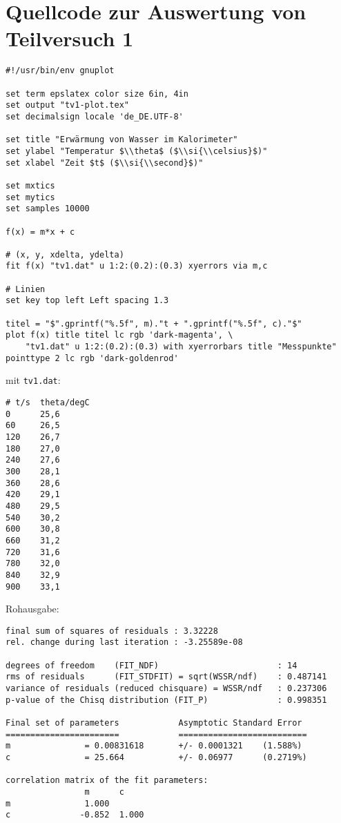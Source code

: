 \section{\gnuplot{} Quellcode zur Auswertung von Teilversuch 1}
	{  
        \renewcommand{\fcolorbox}[4][]{#4}
        \begin{verbatim}
#!/usr/bin/env gnuplot

set term epslatex color size 6in, 4in
set output "tv1-plot.tex"
set decimalsign locale 'de_DE.UTF-8'

set title "Erwärmung von Wasser im Kalorimeter"
set ylabel "Temperatur $\\theta$ ($\\si{\\celsius}$)"
set xlabel "Zeit $t$ ($\\si{\\second}$)"

set mxtics
set mytics
set samples 10000

f(x) = m*x + c

# (x, y, xdelta, ydelta)
fit f(x) "tv1.dat" u 1:2:(0.2):(0.3) xyerrors via m,c

# Linien
set key top left Left spacing 1.3

titel = "$".gprintf("%.5f", m)."t + ".gprintf("%.5f", c)."$"
plot f(x) title titel lc rgb 'dark-magenta', \
	"tv1.dat" u 1:2:(0.2):(0.3) with xyerrorbars title "Messpunkte" pointtype 2 lc rgb 'dark-goldenrod'
        \end{verbatim}
    }
	mit \texttt{tv1.dat}:
    \begin{multicols}{2}
        \begin{verbatim}
# t/s  theta/degC
0      25,6
60     26,5
120    26,7
180    27,0
240    27,6
300    28,1
360    28,6
420    29,1
480    29,5
540    30,2
600    30,8
660    31,2
720    31,6
780    32,0
840    32,9
900    33,1
        \end{verbatim}
    \end{multicols}
    \vspace{-\baselineskip}
	Rohausgabe:
	\begin{verbatim}
final sum of squares of residuals : 3.32228
rel. change during last iteration : -3.25589e-08

degrees of freedom    (FIT_NDF)                        : 14
rms of residuals      (FIT_STDFIT) = sqrt(WSSR/ndf)    : 0.487141
variance of residuals (reduced chisquare) = WSSR/ndf   : 0.237306
p-value of the Chisq distribution (FIT_P)              : 0.998351

Final set of parameters            Asymptotic Standard Error
=======================            ==========================
m               = 0.00831618       +/- 0.0001321    (1.588%)
c               = 25.664           +/- 0.06977      (0.2719%)

correlation matrix of the fit parameters:
                m      c      
m               1.000 
c              -0.852  1.000 
	\end{verbatim}


